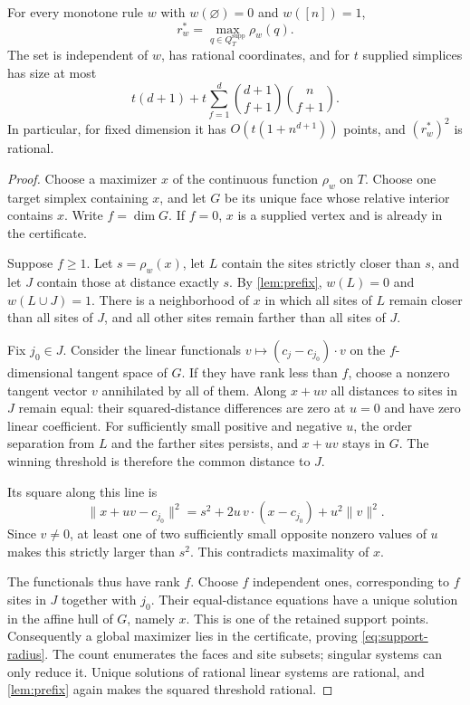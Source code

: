 \begin{theorem}\label{thm:support-radius}
For every monotone rule $w$ with $w(\varnothing)=0$ and $w([n])=1$,
\begin{equation}\label{eq:support-radius}
r_w^*=\max_{q\in Q_T^{\mathrm{supp}}}\rho_w(q).
\end{equation}
The set is independent of $w$, has rational coordinates, and for $t$ supplied simplices has size at most
\begin{equation}\label{eq:support-count}
t(d+1)+t\sum_{f=1}^d\binom{d+1}{f+1}\binom n{f+1}.
\end{equation}
In particular, for fixed dimension it has $O(t(1+n^{d+1}))$ points, and $(r_w^*)^2$ is rational.
\end{theorem}
\begin{proof}
Choose a maximizer $x$ of the continuous function $\rho_w$ on $T$. Choose one target simplex containing $x$, and let $G$ be its unique face whose relative interior contains $x$. Write $f=\dim G$. If $f=0$, $x$ is a supplied vertex and is already in the certificate.

Suppose $f\ge1$. Let $s=\rho_w(x)$, let $L$ contain the sites strictly closer than $s$, and let $J$ contain those at distance exactly $s$. By \cref{lem:prefix}, $w(L)=0$ and $w(L\cup J)=1$. There is a neighborhood of $x$ in which all sites of $L$ remain closer than all sites of $J$, and all other sites remain farther than all sites of $J$.

Fix $j_0\in J$. Consider the linear functionals $v\mapsto(c_j-c_{j_0})\cdot v$ on the $f$-dimensional tangent space of $G$. If they have rank less than $f$, choose a nonzero tangent vector $v$ annihilated by all of them. Along $x+uv$ all distances to sites in $J$ remain equal: their squared-distance differences are zero at $u=0$ and have zero linear coefficient. For sufficiently small positive and negative $u$, the order separation from $L$ and the farther sites persists, and $x+uv$ stays in $G$. The winning threshold is therefore the common distance to $J$.

Its square along this line is
\[
\|x+uv-c_{j_0}\|^2
=s^2+2u\,v\cdot(x-c_{j_0})+u^2\|v\|^2.
\]
Since $v\ne0$, at least one of two sufficiently small opposite nonzero values of $u$ makes this strictly larger than $s^2$. This contradicts maximality of $x$.

The functionals thus have rank $f$. Choose $f$ independent ones, corresponding to $f$ sites in $J$ together with $j_0$. Their equal-distance equations have a unique solution in the affine hull of $G$, namely $x$. This is one of the retained support points. Consequently a global maximizer lies in the certificate, proving \cref{eq:support-radius}. The count enumerates the faces and site subsets; singular systems can only reduce it. Unique solutions of rational linear systems are rational, and \cref{lem:prefix} again makes the squared threshold rational.
\end{proof}

